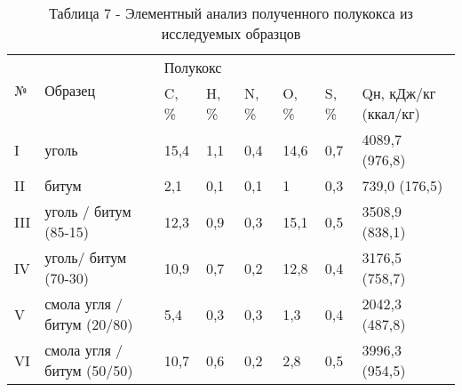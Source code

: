 \begin{table}[H]
\caption*{Таблица 7 - Элементный анализ полученного полукокса из исследуемых образцов}
\centering
\begin{tabular}{|l|l|llllll|}
\hline
\multirow{2}{*}{№} & \multirow{2}{*}{Образец} & \multicolumn{6}{l|}{Полукокс} \\ \cline{3-8}
 &  & \multicolumn{1}{l|}{C, \%} & \multicolumn{1}{l|}{H, \%} & \multicolumn{1}{l|}{N, \%} & \multicolumn{1}{l|}{O, \%} & \multicolumn{1}{l|}{S, \%} & Qн, кДж/кг (ккал/кг) \\ \hline
I & уголь & \multicolumn{1}{l|}{15,4} & \multicolumn{1}{l|}{1,1} & \multicolumn{1}{l|}{0,4} & \multicolumn{1}{l|}{14,6} & \multicolumn{1}{l|}{0,7} & 4089,7 (976,8) \\ \hline
II & битум & \multicolumn{1}{l|}{2,1} & \multicolumn{1}{l|}{0,1} & \multicolumn{1}{l|}{0,1} & \multicolumn{1}{l|}{1} & \multicolumn{1}{l|}{0,3} & 739,0 (176,5) \\ \hline
III & уголь / битум (85-15) & \multicolumn{1}{l|}{12,3} & \multicolumn{1}{l|}{0,9} & \multicolumn{1}{l|}{0,3} & \multicolumn{1}{l|}{15,1} & \multicolumn{1}{l|}{0,5} & 3508,9 (838,1) \\ \hline
IV & уголь/ битум (70-30) & \multicolumn{1}{l|}{10,9} & \multicolumn{1}{l|}{0,7} & \multicolumn{1}{l|}{0,2} & \multicolumn{1}{l|}{12,8} & \multicolumn{1}{l|}{0,4} & 3176,5 (758,7) \\ \hline
V & смола угля / битум (20/80) & \multicolumn{1}{l|}{5,4} & \multicolumn{1}{l|}{0,3} & \multicolumn{1}{l|}{0,3} & \multicolumn{1}{l|}{1,3} & \multicolumn{1}{l|}{0,4} & 2042,3 (487,8) \\ \hline
VI & смола угля / битум (50/50) & \multicolumn{1}{l|}{10,7} & \multicolumn{1}{l|}{0,6} & \multicolumn{1}{l|}{0,2} & \multicolumn{1}{l|}{2,8} & \multicolumn{1}{l|}{0,5} & 3996,3 (954,5) \\ \hline
\end{tabular}
\end{table}

